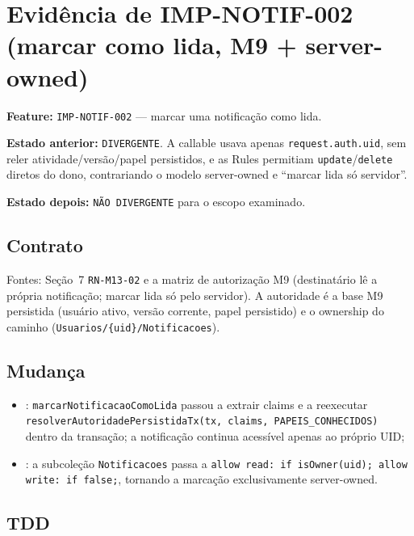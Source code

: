 \section{Evidência de IMP-NOTIF-002 (marcar como lida, M9 + server-owned)}

\textbf{Feature:} \texttt{IMP-NOTIF-002} --- marcar uma notificação como lida.

\textbf{Estado anterior:} \texttt{DIVERGENTE}. A callable usava apenas
\texttt{request.auth.uid}, sem reler atividade/versão/papel persistidos, e as
Rules permitiam \texttt{update}/\texttt{delete} diretos do dono, contrariando o
modelo server-owned e ``marcar lida só servidor''.

\textbf{Estado depois:} \texttt{NÃO DIVERGENTE} para o escopo examinado.

\subsection{Contrato}

Fontes: Seção~7 \texttt{RN-M13-02} e a matriz de autorização M9 (destinatário lê
a própria notificação; marcar lida só pelo servidor). A autoridade é a base M9
persistida (usuário ativo, versão corrente, papel persistido) e o ownership do
caminho (\texttt{Usuarios/\{uid\}/Notificacoes}).

\subsection{Mudança}

\begin{itemize}
  \item {}: \texttt{marcarNotificacaoComoLida}
  passou a extrair claims e a reexecutar
  \texttt{resolverAutoridadePersistidaTx(tx, claims, PAPEIS\_CONHECIDOS)} dentro
  da transação; a notificação continua acessível apenas ao próprio UID;
  \item {}: a subcoleção \texttt{Notificacoes} passa a
  \texttt{allow read: if isOwner(uid); allow write: if false;}, tornando a
  marcação exclusivamente server-owned.
\end{itemize}

\subsection{TDD}

